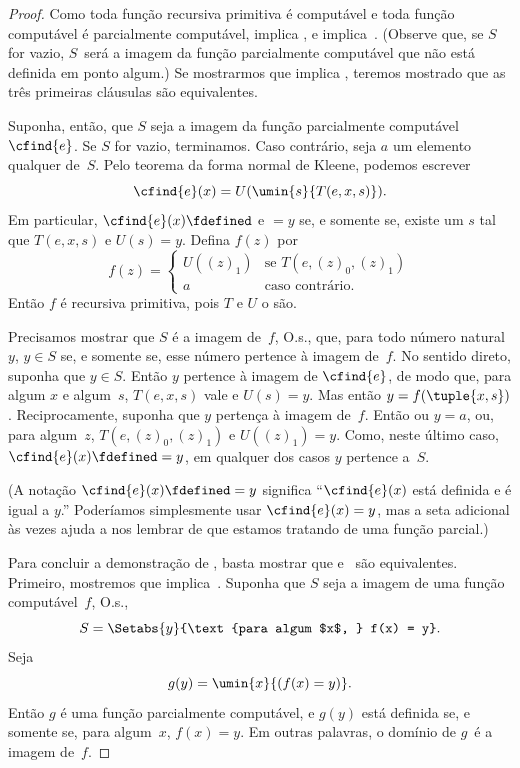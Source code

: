 \documentclass[../../../include/open-logic-section]{subfiles}
\begin{document}
\begin{proof}
Como toda função recursiva primitiva é computável e toda função
computável é parcialmente computável, 
implica , e 
implica~. (Observe que, se $S$ for vazio, $S$~será
a imagem da função parcialmente computável que não está definida em
ponto algum.) Se mostrarmos que  implica
, teremos mostrado que as três primeiras cláusulas
são equivalentes.

Suponha, então, que $S$ seja a imagem da função parcialmente computável
$\cfind{e}$. Se $S$ for vazio, terminamos. Caso contrário, seja $a$ um
elemento qualquer de~$S$. Pelo teorema da forma normal de Kleene,
podemos escrever
\[
\cfind{e}(x) = U(\umin{s}{T(e, x, s)}).
\]
Em particular, $\cfind{e}(x) \fdefined$ e $= y$ se, e somente se,
existe um $s$ tal que $T(e, x, s)$ e $U(s) = y$. Defina $f(z)$ por
\[
f(z) = \begin{cases}
  U((z)_1) & \text{se $T(e, (z)_0, (z)_1)$} \\
  a        & \text{caso contrário.}
\end{cases}
\]
Então $f$ é recursiva primitiva, pois $T$ e $U$
o são. 

Precisamos mostrar que $S$ é a imagem de~$f$, O.s.\@, que, para todo
número natural~$y$, $y \in S$ se, e somente se, esse número pertence
à imagem de~$f$. No sentido direto, suponha que $y \in S$. Então $y$ pertence
à imagem de $\cfind{e}$, de modo que, para algum $x$ e algum~$s$,
$T(e,x,s)$ vale e $U(s) = y$. Mas então
$y = f(\tuple{x,s})$. Reciprocamente, suponha que $y$ pertença à
imagem de~$f$. Então ou $y = a$, ou, para algum~$z$,
$T(e,(z)_0,(z)_1)$ e $U((z)_1) = y$. Como, neste último caso,
$\cfind{e}(x) \fdefined = y$, em qualquer dos casos $y$ pertence
a~$S$.

(A notação $\cfind{e}(x) \fdefined = y$ significa
``$\cfind{e}(x)$ está definida e é igual a $y$.'' Poderíamos
simplesmente usar $\cfind{e}(x) = y$, mas a seta adicional às vezes
ajuda a nos lembrar de que estamos tratando de uma função parcial.)

Para concluir a demonstração de , basta mostrar que
 e~ são equivalentes. Primeiro,
mostremos que  implica~.
Suponha que $S$ seja a imagem de uma função computável~$f$, O.s.\@,
\[
S = \Setabs{y}{\text{para algum $x$, } f(x) = y}.
\]
Seja
\[
g(y) = \umin{x}{(f(x) = y)}.
\]
Então $g$ é uma função parcialmente computável, e $g(y)$ está definida
se, e somente se, para algum~$x$, $f(x) = y$. Em outras palavras, o
domínio de $g$~é a imagem de~$f$. 


\end{proof}
\end{document}
